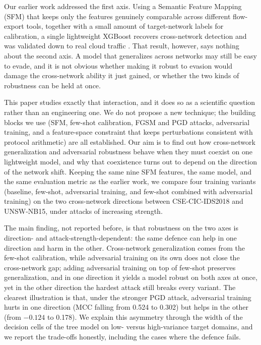 \documentclass[11pt,a4paper]{article}
\begin{document}
Our earlier work addressed the first axis. Using a Semantic Feature Mapping (SFM) that
keeps only the features genuinely comparable across different flow-export tools, together
with a small amount of target-network labels for calibration, a single lightweight
XGBoost recovers cross-network detection and was validated down to real cloud traffic
\cite{martono2024sfm}. That result, however, says nothing about the second axis. A model that generalizes
across networks may still be easy to evade, and it is not obvious whether making it
robust to evasion would damage the cross-network ability it just gained, or whether the
two kinds of robustness can be held at once.

This paper studies exactly that interaction, and it does so as a scientific question
rather than an engineering one. We do not propose a new technique; the building blocks we
use (SFM, few-shot calibration, FGSM and PGD attacks, adversarial training, and a
feature-space constraint that keeps perturbations consistent with protocol arithmetic)
are all established. Our aim is to find out how cross-network generalization and
adversarial robustness behave when they must coexist on one lightweight model, and why
that coexistence turns out to depend on the direction of the network shift. Keeping the
same nine SFM features, the same model, and the same evaluation metric as the earlier
work, we compare four training variants (baseline, few-shot, adversarial training, and
few-shot combined with adversarial training) on the two cross-network directions between
CSE-CIC-IDS2018 and UNSW-NB15, under attacks of increasing strength.

The main finding, not reported before, is that robustness on the two axes is
direction- and attack-strength-dependent: the same defence can help in one direction and
harm in the other. Cross-network generalization comes from the few-shot calibration,
while adversarial training on its own does not close the cross-network gap; adding
adversarial training on top of few-shot preserves generalization, and in one direction it
yields a model robust on both axes at once, yet in the other direction the hardest attack
still breaks every variant. The clearest illustration is that, under the stronger PGD
attack, adversarial training hurts in one direction (MCC falling from 0.524 to 0.302) but
helps in the other (from $-0.124$ to 0.178). We explain this asymmetry through the width
of the decision cells of the tree model on low- versus high-variance target domains, and
we report the trade-offs honestly, including the cases where the defence fails.
\end{document}
